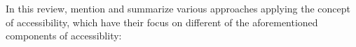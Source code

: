 
In this review, \citet{Geurs2004AccessibilityReview} mention and summarize various approaches applying the concept of accessibility, which have their focus on different of the aforementioned components of accessiblity:

